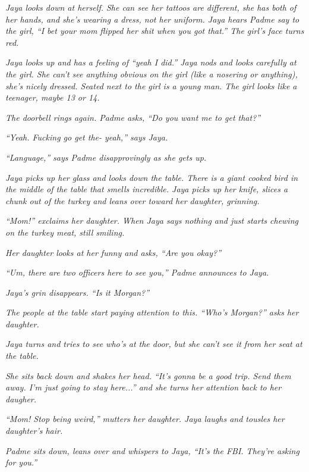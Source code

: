 \textit{Jaya looks down at herself.  She can see her tattoos are different, she has both of her hands, and she's wearing a dress, not her uniform.  Jaya hears Padme say to the girl, ``I bet your mom flipped her shit when you got that.''  The girl's face turns red.}

\textit{Jaya looks up and has a feeling of ``yeah I did.''  Jaya nods and looks carefully at the girl.  She can't see anything obvious on the girl (like a nosering or anything), she's nicely dressed.  Seated next to the girl is a young man.  The girl looks like a teenager, maybe 13 or 14.}



\textit{The doorbell rings again.  Padme asks, ``Do you want me to get that?''}

\textit{``Yeah. Fucking go get the- yeah,'' says Jaya.}

\textit{``Language,'' says Padme disapprovingly as she gets up.}

\textit{Jaya picks up her glass and looks down the table. There is a giant cooked bird in the middle of the table that smells incredible.  Jaya picks up her knife, slices a chunk out of the turkey and leans over toward her daughter, grinning.}

\textit{``Mom!'' exclaims her daughter.  When Jaya says nothing and just starts chewing on the turkey meat, still smiling.  }

\textit{Her daughter looks at her funny and asks, ``Are you okay?''}



\textit{``Um, there are two officers here to see you,'' Padme announces to Jaya.  }

\textit{Jaya's grin disappears.  ``Is it Morgan?''}

\textit{The people at the table start paying attention to this.  ``Who's Morgan?'' asks her daughter.}

\textit{Jaya turns and tries to see who's at the door, but she can't see it from her seat at the table.}

\textit{She sits back down and shakes her head.  ``It's gonna be a good trip.  Send them away.   I'm just going to stay here...'' and she turns her attention back to her daugher.}

\textit{``Mom!  Stop being weird,'' mutters her daughter.  Jaya laughs and tousles her daughter's hair.}



\textit{Padme sits down, leans over and whispers to Jaya, ``It's the FBI.  They're asking for you.''}

